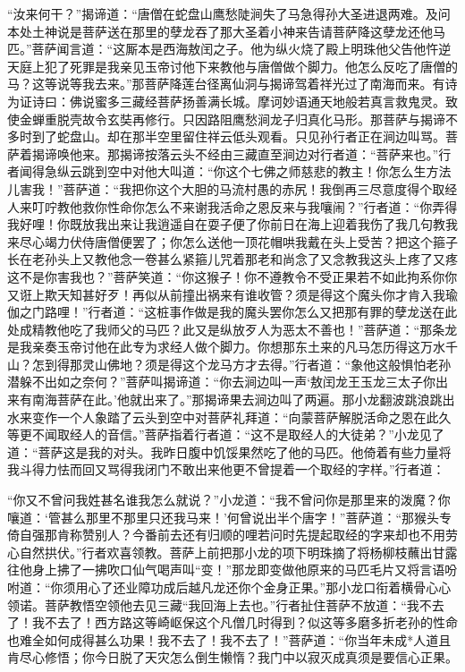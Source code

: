 \documentclass[12pt,UTF8]{ctexbook}
\begin{document}
{“汝来何干？”揭谛道：“唐僧在蛇盘山鹰愁陡涧失了马急得孙大圣进退两难。及问本处土神说是菩萨送在那里的孽龙吞了那大圣着小神来告请菩萨降这孽龙还他马匹。”菩萨闻言道：“这厮本是西海敖闰之子。他为纵火烧了殿上明珠他父告他忤逆天庭上犯了死罪是我亲见玉帝讨他下来教他与唐僧做个脚力。他怎么反吃了唐僧的马？这等说等我去来。”那菩萨降莲台径离仙洞与揭谛驾着祥光过了南海而来。有诗为证诗曰：佛说蜜多三藏经菩萨扬善满长城。摩诃妙语通天地般若真言救鬼灵。致使金蝉重脱壳故令玄奘再修行。只因路阻鹰愁涧龙子归真化马形。那菩萨与揭谛不多时到了蛇盘山。却在那半空里留住祥云低头观看。只见孙行者正在涧边叫骂。菩萨着揭谛唤他来。那揭谛按落云头不经由三藏直至涧边对行者道：“菩萨来也。”行者闻得急纵云跳到空中对他大叫道：“你这个七佛之师慈悲的教主！你怎么生方法儿害我！”菩萨道：“我把你这个大胆的马流村愚的赤尻！我倒再三尽意度得个取经人来叮咛教他救你性命你怎么不来谢我活命之恩反来与我嚷闹？”行者道：“你弄得我好哩！你既放我出来让我逍遥自在耍子便了你前日在海上迎着我伤了我几句教我来尽心竭力伏侍唐僧便罢了；你怎么送他一顶花帽哄我戴在头上受苦？把这个箍子长在老孙头上又教他念一卷甚么紧箍儿咒着那老和尚念了又念教我这头上疼了又疼这不是你害我也？”菩萨笑道：“你这猴子！你不遵教令不受正果若不如此拘系你你又诳上欺天知甚好歹！再似从前撞出祸来有谁收管？须是得这个魔头你才肯入我瑜伽之门路哩！”行者道：“这桩事作做是我的魔头罢你怎么又把那有罪的孽龙送在此处成精教他吃了我师父的马匹？此又是纵放歹人为恶太不善也！”菩萨道：“那条龙是我亲奏玉帝讨他在此专为求经人做个脚力。你想那东土来的凡马怎历得这万水千山？怎到得那灵山佛地？须是得这个龙马方才去得。”行者道：“象他这般惧怕老孙潜躲不出如之奈何？”菩萨叫揭谛道：“你去涧边叫一声‘敖闰龙王玉龙三太子你出来有南海菩萨在此。’他就出来了。”那揭谛果去涧边叫了两遍。那小龙翻波跳浪跳出水来变作一个人象踏了云头到空中对菩萨礼拜道：“向蒙菩萨解脱活命之恩在此久等更不闻取经人的音信。”菩萨指着行者道：“这不是取经人的大徒弟？”小龙见了道：“菩萨这是我的对头。我昨日腹中饥馁果然吃了他的马匹。他倚着有些力量将我斗得力怯而回又骂得我闭门不敢出来他更不曾提着一个取经的字样。”行者道：

“你又不曾问我姓甚名谁我怎么就说？”小龙道：“我不曾问你是那里来的泼魔？你嚷道：‘管甚么那里不那里只还我马来！’何曾说出半个唐字！”菩萨道：“那猴头专倚自强那肯称赞别人？今番前去还有归顺的哩若问时先提起取经的字来却也不用劳心自然拱伏。”行者欢喜领教。菩萨上前把那小龙的项下明珠摘了将杨柳枝蘸出甘露往他身上拂了一拂吹口仙气喝声叫“变！”那龙即变做他原来的马匹毛片又将言语吩咐道：“你须用心了还业障功成后越凡龙还你个金身正果。”那小龙口衔着横骨心心领诺。菩萨教悟空领他去见三藏“我回海上去也。”行者扯住菩萨不放道：“我不去了！我不去了！西方路这等崎岖保这个凡僧几时得到？似这等多磨多折老孙的性命也难全如何成得甚么功果！我不去了！我不去了！”菩萨道：“你当年未成*人道且肯尽心修悟；你今日脱了天灾怎么倒生懒惰？我门中以寂灭成真须是要信心正果。

}
\end{document}
